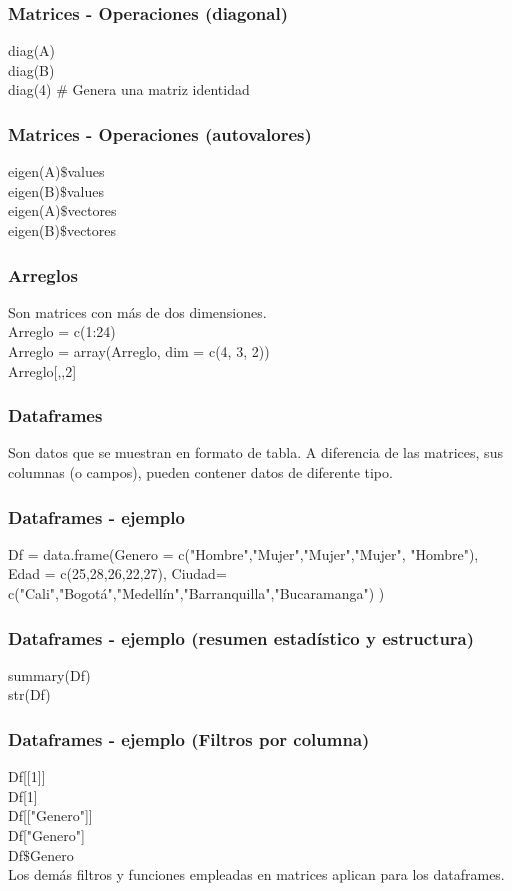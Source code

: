 \documentclass[14pt]{beamer}
\begin{document}
\begin{frame}
	\frametitle{Matrices - Operaciones (diagonal)}
	
	diag(A)\\
	diag(B)\\
	diag(4) $\#$ Genera una matriz identidad
	
\end{frame}

\begin{frame}
	\frametitle{Matrices - Operaciones (autovalores)}
	
	eigen(A)$\$$values\\
	eigen(B)$\$$values\\
	eigen(A)$\$$vectores\\
	eigen(B)$\$$vectores
	
\end{frame}

\begin{frame}
	\frametitle{Arreglos}
	Son matrices con más de dos dimensiones.\\
	Arreglo = c(1:24)\\
	Arreglo = array(Arreglo, dim = c(4, 3, 2))\\
	Arreglo[,,2]
	
\end{frame}

\begin{frame}
	\frametitle{Dataframes}
	Son  datos que se muestran en formato de tabla. A diferencia de las matrices, sus columnas (o campos), pueden contener datos de diferente tipo.
	
\end{frame}

\begin{frame}
	\frametitle{Dataframes - ejemplo}
	Df = data.frame(Genero = c("Hombre","Mujer","Mujer","Mujer", "Hombre"), Edad = c(25,28,26,22,27), Ciudad= c("Cali","Bogotá","Medellín","Barranquilla","Bucaramanga") )
	
\end{frame}

\begin{frame}
	\frametitle{Dataframes - ejemplo (resumen estadístico y estructura)}
	
	summary(Df)\\
	str(Df)
	
\end{frame}

\begin{frame}
	\frametitle{Dataframes - ejemplo (Filtros por columna)}
	
	Df[[1]]\\
	Df[1]\\
	Df[["Genero"]]\\
	Df["Genero"] \\
	Df$\$$Genero\\
	Los demás filtros y funciones empleadas en matrices aplican para los dataframes.
	
\end{frame}
\end{document}
